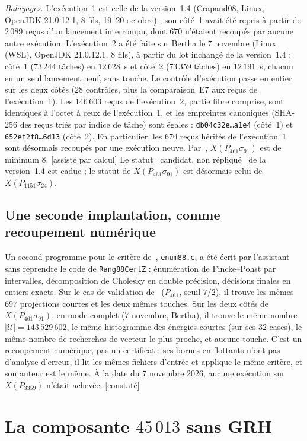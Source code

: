 \documentclass[11pt,a4paper]{amsart}
\theoremstyle{plain}
\theoremstyle{definition}
\newcommand{\XA}{X(P_{3359})}
\newcommand{\XB}{X(P_{461}\sigma_{91})}
\newcommand{\XC}{X(P_{1151}\sigma_{24})}
\newcommand{\st}[1]{\textup{\textsf{\small[#1]}}}
\newcommand{\ASS}{\st{assisté par calcul}}
\newcommand{\CONS}{\st{constaté}}
\begin{document}
\emph{Balayages.} L'exécution~1 est celle de la version~1.4 (Crapaud08, Linux, OpenJDK 21.0.12.1, $8$ fils, 19--20 octobre) ; son côté~1 avait été repris à partir de $2\,089$ reçus d'un lancement interrompu, dont $670$ n'étaient recoupés par aucune autre exécution. L'exécution~2 a été faite sur Bertha le 7 novembre (Linux (WSL), OpenJDK 21.0.12.1, $8$ fils), à partir du lot inchangé de la version~1.4 : côté~1 ($73\,244$ tâches) en $12\,628$~s et côté~2 ($73\,359$ tâches) en $12\,191$~s, chacun en un seul lancement neuf, sans touche. Le contrôle d'exécution passe en entier sur les deux côtés ($28$ contrôles, plus la comparaison~E7 aux reçus de l'exécution~1). Les $146\,603$ reçus de l'exécution~2, partie fibre comprise, sont identiques à l'octet à ceux de l'exécution~1, et les empreintes canoniques (SHA-256 des reçus triés par indice de tâche) sont égales : \texttt{db04c32e\dots a1e4} (côté~1) et \texttt{652ef2f8\dots 6d13} (côté~2). En particulier, les $670$ reçus hérités de l'exécution~1 sont désormais recoupés par une exécution neuve. Par~\cite[th.~4.6]{Gau26}, $\XB$ est de minimum $8$. \ASS{} Le statut \guillemotleft~candidat, non répliqué~\guillemotright{} de la version~1.4 est caduc ; le statut de $\XB$ est désormais celui de $\XC$.

\subsection{Une seconde implantation, comme recoupement numérique}\label{subsec:enum88}
Un second programme pour le critère de~\cite[th.~4.6]{Gau26}, \texttt{enum88.c}, a été écrit par l'assistant sans reprendre le code de \texttt{Rang88CertZ} : énumération de Fincke--Pohst par intervalles, décomposition de Cholesky en double précision, décisions finales en entiers exacts. Sur le cas de validation de~\cite[\S5.2]{Gau26} ($P_{461}$, seuil $7/2$), il trouve les mêmes $697$ projections courtes et les deux mêmes touches. Sur les deux côtés de $\XB$, en mode complet (7 novembre, Bertha), il trouve le même nombre $|\mathcal U|=143\,529\,602$, le même histogramme des énergies courtes (sur ses $32$ cases), le même nombre de recherches de vecteur le plus proche, et aucune touche. C'est un recoupement numérique, pas un certificat : ses bornes en flottants n'ont pas d'analyse d'erreur, il lit les mêmes fichiers d'entrée et applique le même critère, et son auteur est le même. À la date du 7 novembre 2026, aucune exécution sur $\XA$ n'était achevée. \CONS

\section{La composante \texorpdfstring{$45\,013$}{45013} sans GRH}\label{sec:45013}
\end{document}
